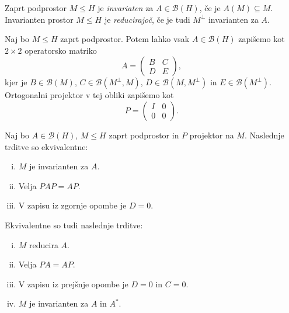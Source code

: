 \begin{definicija}
Zaprt podprostor $M \leq H$ je
\emph{invariaten} za
$A \in \mathcal{B}(H)$, če je $A(M) \subseteq M$. Invarianten
prostor $M \leq H$ je
\emph{reducirajoč}, če je tudi
$M^\bot$ invarianten za $A$.
\end{definicija}

\begin{opomba}
Naj bo $M \leq H$ zaprt podprostor. Potem lahko vsak
$A \in \mathcal{B}(H)$ zapišemo kot $2 \times 2$ operatorsko
matriko
\[
A = \begin{pmatrix}
B & C \\
D & E
\end{pmatrix},
\]
kjer je $B \in \mathcal{B}(M)$, $C \in \mathcal{B}(M^\bot, M)$,
$D \in \mathcal{B}(M, M^\bot)$ in $E \in \mathcal{B}(M^\bot)$.
Ortogonalni projektor v tej obliki zapišemo kot
\[
P = \begin{pmatrix}
I & 0 \\
0 & 0
\end{pmatrix}.
\]
\end{opomba}

\begin{trditev}
Naj bo $A \in \mathcal{B}(H)$, $M \leq H$ zaprt podprostor in $P$
projektor na $M$. Naslednje trditve so ekvivalentne:

\begin{enumerate}[i)]
\item $M$ je invarianten za $A$.
\item Velja $PAP = AP$.
\item V zapisu iz zgornje opombe je $D = 0$.
\end{enumerate}

Ekvivalentne so tudi naslednje trditve:

\begin{enumerate}[i)]
\item $M$ reducira $A$.
\item Velja $PA = AP$.
\item V zapisu iz prejšnje opombe je $D = 0$ in $C = 0$.
\item $M$ je invarianten za $A$ in $A^*$.
\end{enumerate}
\end{trditev}

